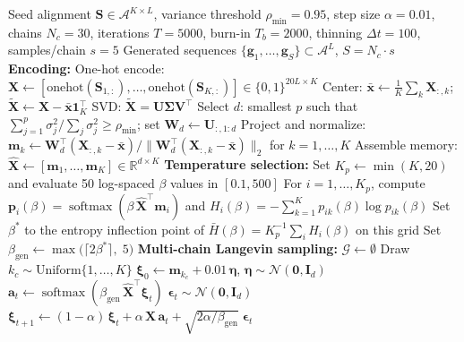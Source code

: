\begin{algorithm}[ht]
\caption{Stochastic Attention Protein Sequence Generation}\label{alg:sa-pipeline}
\begin{algorithmic}[1]
\REQUIRE Seed alignment $\mathbf{S} \in \mathcal{A}^{K \times L}$, variance threshold $\rho_{\min} = 0.95$, step size $\alpha = 0.01$, chains $N_c = 30$, iterations $T = 5000$, burn-in $T_b = 2000$, thinning $\Delta t = 100$, samples/chain $s = 5$
\ENSURE Generated sequences $\{\mathbf{g}_1, \ldots, \mathbf{g}_S\} \subset \mathcal{A}^L$, \; $S = N_c \cdot s$
\STATE \textbf{Encoding:}
\STATE One-hot encode: $\mathbf{X} \leftarrow [\mathrm{onehot}(\mathbf{S}_{1,:}), \ldots, \mathrm{onehot}(\mathbf{S}_{K,:})] \in \{0,1\}^{20L \times K}$
\STATE Center: $\bar{\mathbf{x}} \leftarrow \frac{1}{K}\sum_k \mathbf{X}_{:,k}$; \; $\tilde{\mathbf{X}} \leftarrow \mathbf{X} - \bar{\mathbf{x}}\mathbf{1}_K^\top$
\STATE SVD: $\tilde{\mathbf{X}} = \mathbf{U}\boldsymbol{\Sigma}\mathbf{V}^\top$
\STATE Select $d$: smallest $p$ such that $\sum_{j=1}^{p}\sigma_j^2 / \sum_j \sigma_j^2 \geq \rho_{\min}$; set $\mathbf{W}_d \leftarrow \mathbf{U}_{:,1:d}$
\STATE Project and normalize: $\mathbf{m}_k \leftarrow \mathbf{W}_d^\top(\mathbf{X}_{:,k} - \bar{\mathbf{x}}) / \|\mathbf{W}_d^\top(\mathbf{X}_{:,k} - \bar{\mathbf{x}})\|_2$ \; for $k = 1,\ldots,K$
\STATE Assemble memory: $\hat{\mathbf{X}} \leftarrow [\mathbf{m}_1, \ldots, \mathbf{m}_K] \in \mathbb{R}^{d \times K}$
\STATE \textbf{Temperature selection:}
\STATE Set $K_p \leftarrow \min(K,20)$ and evaluate 50 log-spaced $\beta$ values in $[0.1,500]$
\STATE For $i=1,\ldots,K_p$, compute $\mathbf{p}_i(\beta)=\operatorname{softmax}(\beta\,\hat{\mathbf{X}}^\top\mathbf{m}_i)$ and $H_i(\beta)=-\sum_{k=1}^{K} p_{ik}(\beta)\log p_{ik}(\beta)$
\STATE Set $\beta^*$ to the entropy inflection point of $\bar H(\beta)=K_p^{-1}\sum_i H_i(\beta)$ on this grid
\STATE Set $\beta_{\mathrm{gen}} \leftarrow \max\!\bigl(\lceil 2\beta^* \rceil,\; 5\bigr)$
\STATE \textbf{Multi-chain Langevin sampling:}
\STATE $\mathcal{G} \leftarrow \emptyset$
    \STATE Draw $k_c \sim \mathrm{Uniform}\{1,\ldots,K\}$
    \STATE $\boldsymbol{\xi}_0 \leftarrow \mathbf{m}_{k_c} + 0.01\,\boldsymbol{\eta}$, \; $\boldsymbol{\eta} \sim \mathcal{N}(\mathbf{0}, \mathbf{I}_d)$
        \STATE $\mathbf{a}_t \leftarrow \operatorname{softmax}(\beta_{\mathrm{gen}}\,\hat{\mathbf{X}}^\top\boldsymbol{\xi}_t)$
        \STATE $\boldsymbol{\epsilon}_t \sim \mathcal{N}(\mathbf{0}, \mathbf{I}_d)$
        \STATE $\boldsymbol{\xi}_{t+1} \leftarrow (1-\alpha)\,\boldsymbol{\xi}_t + \alpha\,\hat{\mathbf{X}}\,\mathbf{a}_t + \sqrt{2\alpha/\beta_{\mathrm{gen}}}\;\boldsymbol{\epsilon}_t$

\end{algorithmic}
\end{algorithm}
